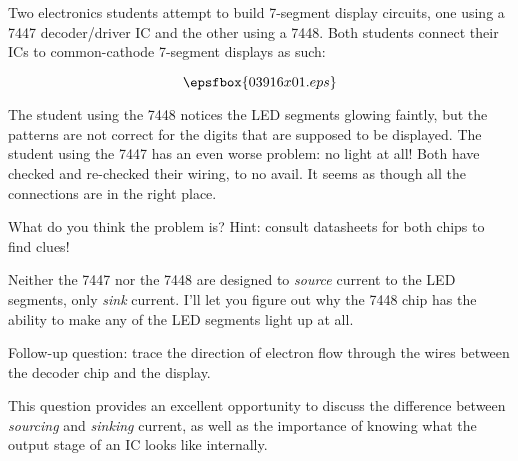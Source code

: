 

Two electronics students attempt to build 7-segment display circuits, one using a 7447 decoder/driver IC and the other using a 7448.  Both students connect their ICs to common-cathode 7-segment displays as such:

$$\epsfbox{03916x01.eps}$$

The student using the 7448 notices the LED segments glowing faintly, but the patterns are not correct for the digits that are supposed to be displayed.  The student using the 7447 has an even worse problem: no light at all!  Both have checked and re-checked their wiring, to no avail.  It seems as though all the connections are in the right place.

What do you think the problem is?  Hint: consult datasheets for both chips to find clues!







Neither the 7447 nor the 7448 are designed to {\it source} current to the LED segments, only {\it sink} current.  I'll let you figure out why the 7448 chip has the ability to make any of the LED segments light up at all.

\vskip 10pt

Follow-up question: trace the direction of electron flow through the wires between the decoder chip and the display.







This question provides an excellent opportunity to discuss the difference between {\it sourcing} and {\it sinking} current, as well as the importance of knowing what the output stage of an IC looks like internally.




